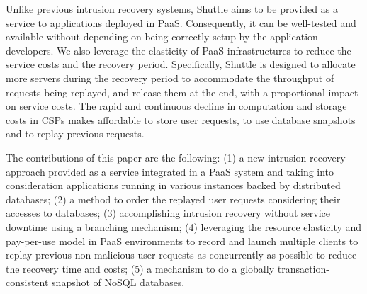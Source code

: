 Unlike previous intrusion recovery systems, Shuttle aims to be provided as a service to applications deployed in \ac{PaaS}. Consequently, it can be well-tested and available without depending on being correctly setup by the application developers. We also leverage the elasticity of \ac{PaaS} infrastructures to reduce the service costs and the recovery period. Specifically, Shuttle is designed to allocate more servers during the recovery period to accommodate the throughput of requests being replayed, and release them at the end, with a proportional impact on service costs. The rapid and continuous decline in computation and storage costs in CSPs makes affordable to store user requests, to use database snapshots and to replay previous requests.

The contributions of this paper are the following: 
(1) a new intrusion recovery approach provided as a service integrated in a \ac{PaaS} system and taking into consideration applications running in various instances backed by distributed databases;
(2) a method to order the replayed user requests considering their accesses to databases;
(3) accomplishing intrusion recovery without service downtime using a branching mechanism;
(4) leveraging the resource elasticity and pay-per-use model in \ac{PaaS} environments to record and launch multiple clients to replay previous non-malicious user requests as concurrently as possible to reduce the recovery time and costs;
(5) a mechanism to do a globally transaction-consistent snapshot of NoSQL databases.

